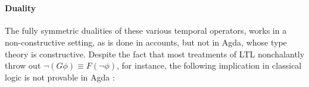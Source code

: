 \documentclass[a4paper, 11pt]{article}
\begin{document}
\begin{code}
\AgdaSymbol{(}\AgdaSpace{}%
\AgdaSymbol{(}\AgdaSpace{}%
\AgdaSymbol{)}\AgdaSpace{}%
\AgdaSymbol{(}\AgdaSpace{}%
\AgdaSymbol{)}\AgdaSpace{}%
\AgdaSymbol{)}\AgdaSpace{}%
\AgdaSpace{}%
\AgdaSpace{}%
\AgdaSymbol{(}\AgdaSpace{}%
\AgdaSymbol{)}\AgdaSpace{}%
\<%
\\
%
\>[2]\AgdaSpace{}%
\AgdaSpace{}%
\AgdaSymbol{(}\AgdaSpace{}%
\AgdaSpace{}%
\AgdaSymbol{)}\AgdaSpace{}%
\AgdaSymbol{=}\AgdaSpace{}%
\AgdaSpace{}%
\AgdaSymbol{(}\AgdaSpace{}%
\AgdaSymbol{)}\AgdaSpace{}%
\AgdaSymbol{(}\AgdaSpace{}%
\AgdaSymbol{)}\AgdaSpace{}%
\AgdaSpace{}%
\AgdaSpace{}%
\AgdaSpace{}%
\AgdaSymbol{(}\AgdaSpace{}%
\AgdaSymbol{)}\AgdaSpace{}%
\<%
\end{code}

\paragraph{Duality}

The fully symmetric dualities of these various temporal operators, works in a
non-constructive setting, as is done in accounts, but not in Agda, whose type
theory is constructive. Despite the fact that most treatments of LTL
nonchalantly throw out $\neg (G\phi) \equiv F(\neg\phi)$, for instance, the
following implication in classical logic is not provable in Agda :
\end{document}
